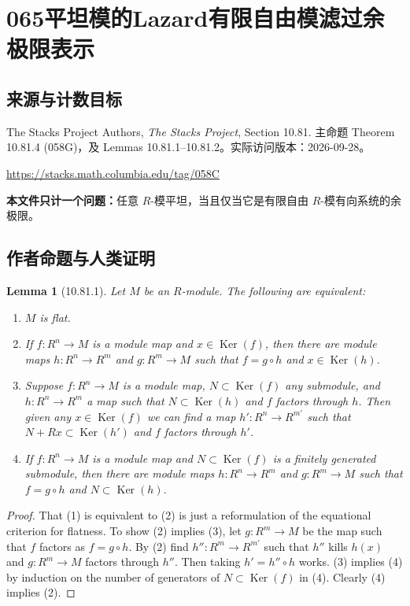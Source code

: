 \documentclass[UTF8,11pt]{ctexart}
\newtheorem*{lemma}{Lemma}
\theoremstyle{definition}
\begin{document}
\section*{065\quad 平坦模的Lazard有限自由模滤过余极限表示}
\subsection*{来源与计数目标}
The Stacks Project Authors, \emph{The Stacks Project}, Section 10.81. 主命题 Theorem 10.81.4 (058G)，及 Lemmas 10.81.1--10.81.2。实际访问版本：2026-09-28。
\par\url{https://stacks.math.columbia.edu/tag/058C}
\par\textbf{本文件只计一个问题：}任意 $R$-模平坦，当且仅当它是有限自由 $R$-模有向系统的余极限。
\subsection*{作者命题与人类证明}
\begin{lemma}[10.81.1]
Let $M$ be an $R$-module. The following are equivalent:
\begin{enumerate}
\item $M$ is flat.
\item If $f:R^n\to M$ is a module map and $x\in\operatorname{Ker}(f)$, then there are module maps $h:R^n\to R^m$ and $g:R^m\to M$ such that $f=g\circ h$ and $x\in\operatorname{Ker}(h)$.
\item Suppose $f:R^n\to M$ is a module map, $N\subset\operatorname{Ker}(f)$ any submodule, and $h:R^n\to R^m$ a map such that $N\subset\operatorname{Ker}(h)$ and $f$ factors through $h$. Then given any $x\in\operatorname{Ker}(f)$ we can find a map $h':R^n\to R^{m'}$ such that $N+Rx\subset\operatorname{Ker}(h')$ and $f$ factors through $h'$.
\item If $f:R^n\to M$ is a module map and $N\subset\operatorname{Ker}(f)$ is a finitely generated submodule, then there are module maps $h:R^n\to R^m$ and $g:R^m\to M$ such that $f=g\circ h$ and $N\subset\operatorname{Ker}(h)$.
\end{enumerate}
\end{lemma}
\begin{proof}
That (1) is equivalent to (2) is just a reformulation of the equational criterion for flatness. To show (2) implies (3), let $g:R^m\to M$ be the map such that $f$ factors as $f=g\circ h$. By (2) find $h'':R^m\to R^{m'}$ such that $h''$ kills $h(x)$ and $g:R^m\to M$ factors through $h''$. Then taking $h'=h''\circ h$ works. (3) implies (4) by induction on the number of generators of $N\subset\operatorname{Ker}(f)$ in (4). Clearly (4) implies (2).
\end{proof}
\end{document}
